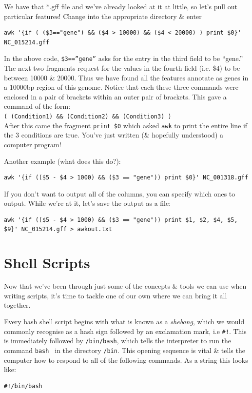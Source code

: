 \documentclass[a4paper,12pt,twoside]{memoir}
\begin{document}
\begin{steps}
We have that *.gff file and we've already looked at it at little, so let's pull out particular features!
Change into the appropriate directory \& enter
\begin{lstlisting}
awk '{if ( ($3=="gene") && ($4 > 10000) && ($4 < 20000) ) print $0}' NC_015214.gff
\end{lstlisting}
\end{steps}
\begin{note}
In the above code, \texttt{\$3==''gene''} asks for the entry in the third field to be ``gene.''
The next two fragments request for the values in the fourth field (i.e. \$4) to be between 10000 \& 20000.
Thus we have found all the features annotate as genes in a 10000bp region of this genome.
Notice that each these three commands were enclosed in a pair of brackets within an outer pair of brackets.
This gave a command of the form: \\
\texttt{( (Condition1) \&\& (Condition2) \&\& (Condition3) )} \\
After this came the fragment \texttt{print \$0} which asked \texttt{awk} to print the entire line if the 3 conditions are true.
You've just written (\& hopefully understood) a computer program!
\end{note}

\begin{steps}
Another example (what does this do?): \\
\begin{lstlisting}
awk '{if (($5 - $4 > 1000) && ($3 == "gene")) print $0}' NC_001318.gff 
\end{lstlisting}
If you don't want to output all of the columns, you can specify which ones to output.  
While we're at it, let's save the output as a file: \\
\begin{lstlisting}
awk '{if (($5 - $4 > 1000) && ($3 == "gene")) print $1, $2, $4, $5, $9}' NC_015214.gff > awkout.txt
\end{lstlisting}
\end{steps}

\section{Shell Scripts}
Now that we've been through just some of the concepts \& tools we can use when writing scripts, it's time to tackle one of our own where we can bring it all together.

\begin{information}
Every bash shell script begins with what is known as a \textit{shebang}, which we would commonly recognise as a hash sign followed by an exclamation mark, i.e \texttt{\#!}.
This is immediately followed by \texttt{/bin/bash}, which tells the interpreter to run the command \texttt{bash } in the directory \texttt{/bin}.
This opening sequence is vital \& tells the computer how to respond to all of the following commands.
As a string this looks like:\\
\begin{lstlisting}
#!/bin/bash
\end{lstlisting}
\end{information}
\end{document}
